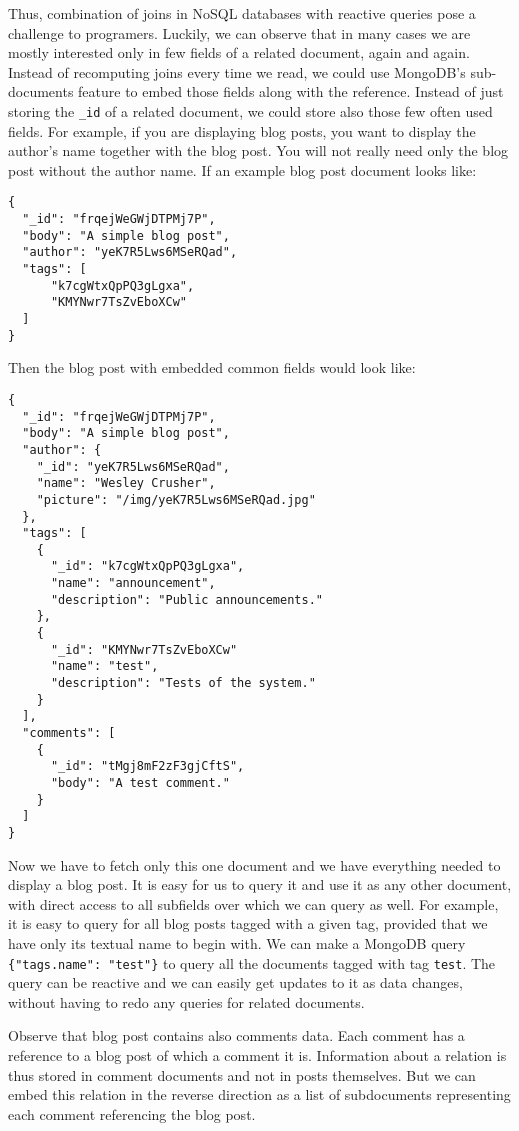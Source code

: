 Thus, combination of joins in NoSQL databases with reactive queries pose a challenge to programers.
Luckily, we can observe that in many cases we are mostly interested only in few fields of a related document, again and again.
Instead of recomputing joins every time we read, we could use MongoDB's sub-documents feature to embed those fields along with the reference.
Instead of just storing the \verb|_id| of a related document, we could store also those few often used fields.
For example, if you are displaying blog posts, you want to display the author's name together with the blog post.
You will not really need only the blog post without the author name.
If an example blog post document looks like:

\begin{verbatim}
{
  "_id": "frqejWeGWjDTPMj7P",
  "body": "A simple blog post",
  "author": "yeK7R5Lws6MSeRQad",
  "tags": [
      "k7cgWtxQpPQ3gLgxa",
      "KMYNwr7TsZvEboXCw"
  ]
}
\end{verbatim}

Then the blog post with embedded common fields would look like:

\begin{verbatim}
{
  "_id": "frqejWeGWjDTPMj7P",
  "body": "A simple blog post",
  "author": {
    "_id": "yeK7R5Lws6MSeRQad",
    "name": "Wesley Crusher",
    "picture": "/img/yeK7R5Lws6MSeRQad.jpg"
  },
  "tags": [
    {
      "_id": "k7cgWtxQpPQ3gLgxa",
      "name": "announcement",
      "description": "Public announcements."
    },
    {
      "_id": "KMYNwr7TsZvEboXCw"
      "name": "test",
      "description": "Tests of the system."
    }
  ],
  "comments": [
    {
      "_id": "tMgj8mF2zF3gjCftS",
      "body": "A test comment."
    }
  ]
}
\end{verbatim}

Now we have to fetch only this one document and we have everything needed to display a blog post.
It is easy for us to query it and use it as any other document, with direct access to all subfields over which we can query as well.
For example, it is easy to query for all blog posts tagged with a given tag, provided that we have only its textual name to begin with.
We can make a MongoDB query \verb|{"tags.name": "test"}| to query all the documents tagged with tag \verb|test|.
The query can be reactive and we can easily get updates to it as data changes, without having to redo any queries for related documents.

Observe that blog post contains also comments data.
Each comment has a reference to a blog post of which a comment it is.
Information about a relation is thus stored in comment documents and not in posts themselves.
But we can embed this relation in the reverse direction as a list of subdocuments representing each comment referencing the blog post.

